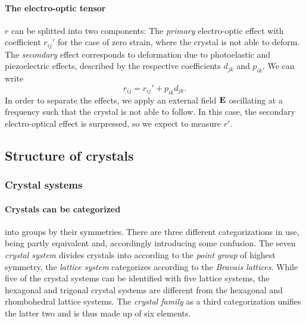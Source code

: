 \paragraph{The electro-optic tensor}
$r$ can be splitted into two components:
The \emph{primary} electro-optic effect with coefficient $r_{ij}'$
for the case of zero strain, where the crystal is 
not able to deform. The \emph{secondary} effect corresponds to deformation 
due to photoelastic and piezoelectric effects, described by the 
respective coefficients $d_{jk}$ and $p_{ik}$.
We can write
\begin{equation}
    r_{ij} = r_{ij}' + p_{ik} d_{jk}.
\end{equation}
In order to separate the effects, we apply an external field $\mathbf{E}$ 
oscillating at a frequency such that the crystal is not able 
to follow. In this case, the secondary electro-optical effect is surpressed, 
so we expect to measure $r'$. 

\subsection{Structure of crystals}

\subsubsection{Crystal systems}
\paragraph{Crystals can be categorized} 
into groups by their symmetries. 
There are three different categorizations in use, being 
partly equivalent and, accordingly introducing some confusion. 
The seven \emph{crystal system} divides crystals into 
according to the \emph{point group} of highest symmetry, 
the \emph{lattice system} 
categorizes according to the \emph{Bravais lattices}. While 
five of the crystal systems can be identified with five 
lattice systems, the hexagonal and trigonal crystal systems 
are different from the hexagonal and rhombohedral lattice systems. 
The \emph{crystal family} as a third categorization unifies 
the latter two and is thus made up of six elements. 

